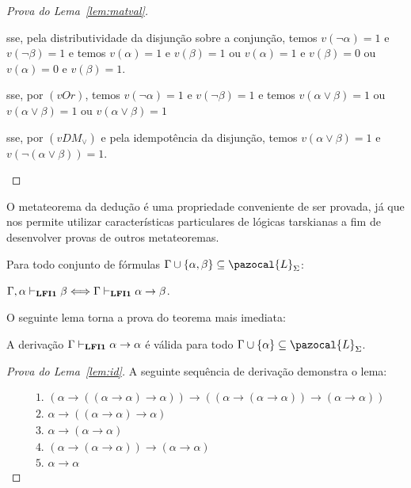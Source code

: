 \begin{proof}[Prova do Lema~\ref{lem:matval}]
\begin{provaporcasos}
\begin{provaporsubcasos}
                    \qquad{}sse, pela distributividade da disjunção sobre a conjunção, temos $v(\neg \alpha) = 1$ e $v(\neg \beta) = 1$ e temos $v(\alpha) = 1$ e $v(\beta) = 1$ ou $v(\alpha) = 1$ e $v(\beta) = 0$ ou $v(\alpha) = 0$ e $v(\beta) = 1$.

                    \qquad{}sse, por $(vOr)$, temos $v(\neg \alpha) = 1$ e $v(\neg \beta) = 1$ e temos $v(\alpha \lor \beta) = 1$ ou $v(\alpha \lor \beta) = 1$ ou $v(\alpha \lor \beta) = 1$
                    
                    \qquad{}sse, por $(vDM_{\lor})$ e pela idempotência da disjunção, temos $v(\alpha \lor \beta) = 1$ e $v(\neg(\alpha \lor \beta)) = 1$.
            \end{provaporsubcasos}

        \end{provaporcasos}


    \end{proof}


    O metateorema da dedução é uma propriedade conveniente de ser provada, já que nos permite utilizar características particulares de lógicas tarskianas a fim de desenvolver provas de outros metateoremas.
    
    \begin{teorema}\label{teo:deducao}
        Para todo conjunto de fórmulas $\Gamma \cup \{\alpha, \beta \} \subseteq \pazocal{L}_{\Sigma}$:

        \centering
        {\normalfont{} $\Gamma, \alpha \vdash_{{\normalfont\textbf{LFI1}}{}} \beta \Longleftrightarrow \Gamma \vdash_{{\normalfont\textbf{LFI1}}{}} \alpha \to \beta$.}
    \end{teorema}

    O seguinte lema torna a prova do teorema mais imediata:
    \begin{lema}\label{lem:id}
        A derivação $\Gamma \vdash_{{\normalfont\textbf{LFI1}}{}} \alpha \to \alpha$ é válida para todo $\Gamma \cup \{\alpha\} \subseteq \pazocal{L}_{\Sigma}$.
    \end{lema}
    
    \begin{proof}[Prova do Lema~\ref{lem:id}]
        A seguinte sequência de derivação demonstra o lema:
        
        \begin{align*}
            & \text{1. } (\alpha \to ((\alpha \to \alpha) \to \alpha)) \to ((\alpha \to (\alpha \to \alpha)) \to (\alpha \to \alpha))\tag{Ax2}\\
            & \text{2. } \alpha \to ((\alpha \to \alpha) \to \alpha)\tag{Ax1}\\
            & \text{3. } \alpha \to (\alpha \to \alpha)\tag{Ax1}\\
            & \text{4. } (\alpha \to (\alpha \to \alpha)) \to (\alpha \to \alpha)\tag{MP 1,2}\\
            & \text{5. } \alpha \to \alpha\tag{MP 3,4}
        \end{align*}
    \end{proof}

